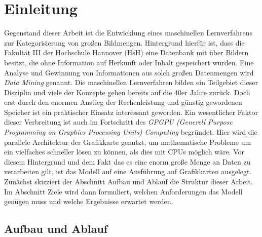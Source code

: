 \chapter{Einleitung}

Gegenstand dieser Arbeit ist die Entwicklung eines maschinellen Lernverfahrens zur Kategorisierung von großen Bildmengen. Hintergrund hierfür ist, dass die Fakultät III der Hochschule Hannover (HsH) eine Datenbank mit über Bildern besitzt, die ohne Information auf Herkunft oder Inhalt gespeichert wurden. Eine Analyse und Gewinnung von Informationen aus solch großen Datenmengen wird \textit{Data Mining} genannt. Die maschinellen Lernverfahren bilden ein Teilgebiet dieser Disziplin und viele der Konzepte gehen bereits auf die 40er Jahre zurück. Doch erst durch den enormen Anstieg der Rechenleistung und günstig gewordenen Speicher ist ein praktischer Einsatz interessant geworden. 
Ein wesentlicher Faktor dieser Verbreitung ist auch im Fortschritt des \textit{GPGPU (Generell Purpose Programming on Graphics Processing Units) Computing} begründet. Hier wird die parallele Architektur der Grafikkarte genutzt, um mathematische Probleme um ein vielfaches schneller lösen zu können, als dies mit CPUs möglich wäre. Vor diesem Hintergrund und dem Fakt das es eine enorm große Menge an Daten zu verarbeiten gilt, ist das Modell auf eine Ausführung auf Grafikkarten ausgelegt. \newline
Zunächst skizziert der Abschnitt Aufbau und Ablauf die Struktur dieser Arbeit. Im Abschnitt Ziele wird dann formuliert, welchen Anforderungen das Modell genügen muss und welche Ergebnisse erwartet werden.

\section{Aufbau und Ablauf}

